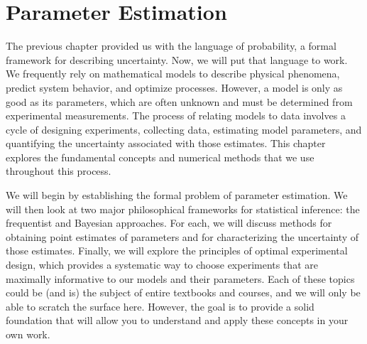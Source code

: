 \chapter{Parameter Estimation} %
\label{sec:models-vs-data}

The previous chapter provided us with the language of probability, a formal framework for describing uncertainty. Now, we will put that language to work. We frequently rely on mathematical models to describe physical phenomena, predict system behavior, and optimize processes. However, a model is only as good as its parameters, which are often unknown and must be determined from experimental measurements. The process of relating models to data involves a cycle of designing experiments, collecting data, estimating model parameters, and quantifying the uncertainty associated with those estimates. This chapter explores the fundamental concepts and numerical methods that we use throughout this process.

We will begin by establishing the formal problem of parameter estimation. We will then look at two major philosophical frameworks for statistical inference: the frequentist and Bayesian approaches. For each, we will discuss methods for obtaining point estimates of parameters and for characterizing the uncertainty of those estimates. Finally, we will explore the principles of optimal experimental design, which provides a systematic way to choose experiments that are maximally informative to our models and their parameters. Each of these topics could be (and is) the subject of entire textbooks and courses, and we will only be able to scratch the surface here. However, the goal is to provide a solid foundation that will allow you to understand and apply these concepts in your own work.

